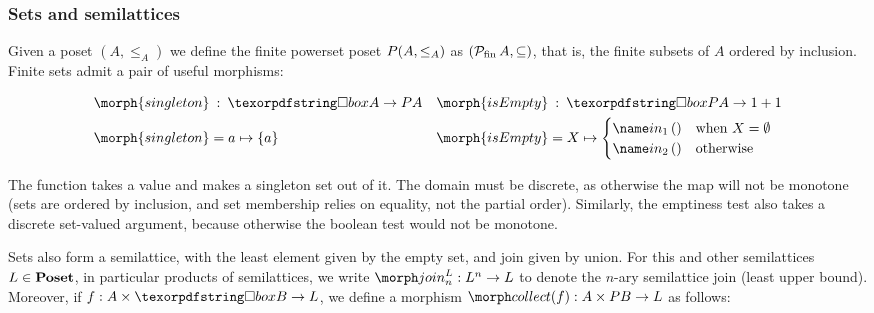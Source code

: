 
\subsubsection{Sets and semilattices}

Given a poset $(A, \le_A)$ we define the finite powerset poset $P (A,
\le_A)$ as $(\mathcal{P}_{\mathrm{fin}}\, A, \subseteq)$, that is, the finite
subsets of $A$ ordered by inclusion.\footnotemark\
%
Finite sets admit a pair of useful morphisms:


\begin{align*}
  \morph{singleton} &\isa \iso A \to \pfinof A
  &
  \morph{isEmpty} &\isa \iso \pfinof A \to \terminalobject + \terminalobject
  \\
  \morph{singleton} &= a \mapsto \{a\}
  &
  \morph{isEmpty} &= X \mapsto 
  \begin{cases}
    \inj 1 () &\text{when }X = \emptyset\\
    \inj 2 () &\text{otherwise}
  \end{cases}
\end{align*}

\noindent
The  function takes a value and makes a singleton set out of
it. The domain must be discrete, as otherwise the map will not be monotone (sets
are ordered by inclusion, and set membership relies on equality, not the partial
order). Similarly, the emptiness test \morph{isEmpty} also takes a discrete
set-valued argument, because otherwise the boolean test would not be monotone.

Sets also form a semilattice, with the least element given by the empty set, and
join given by union.
%
For this and other semilattices $L \in \textrm{\bfseries Poset}$, in particular products of
semilattices, we write $\morphjoin{L}{n} : L^n \to L$ to denote the $n$-ary
semilattice join (least upper bound).
%
Moreover, if $f : A \times \iso B \to L$, we define a morphism
$\pcollect{f} : A \times \pfinof{B} \to L$ as follows:

